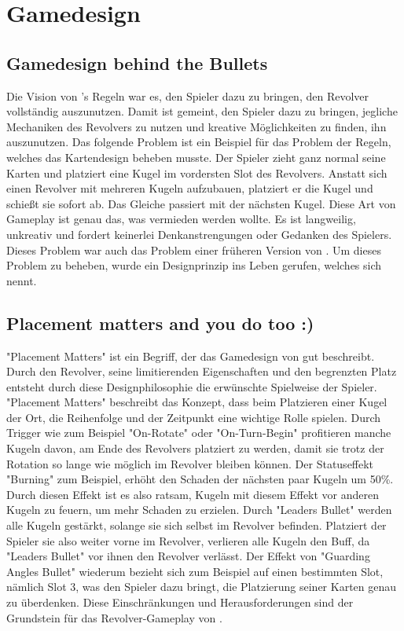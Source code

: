 
\section{Gamedesign}\label{sec:differenzierung}

\renewcommand{\kapitelautor}{Autor: Philip Jankovic} %


\subsection{Gamedesign behind the Bullets}\label{subsec:gamedesignBehindBullets}

Die Vision von \FF's Regeln war es, den Spieler dazu zu bringen, den Revolver vollständig auszunutzen. Damit ist gemeint,
den Spieler dazu zu bringen, jegliche Mechaniken des Revolvers zu nutzen und kreative Möglichkeiten zu finden, ihn auszunutzen.
Das folgende Problem ist ein Beispiel für das Problem der \FF Regeln, welches das Kartendesign beheben musste.
Der Spieler zieht ganz normal seine Karten und platziert eine Kugel im vordersten Slot des Revolvers.
Anstatt sich einen Revolver mit mehreren Kugeln aufzubauen, platziert er die Kugel und schießt sie sofort ab.
Das Gleiche passiert mit der nächsten Kugel. Diese Art von Gameplay ist genau das, was vermieden werden wollte.
Es ist langweilig, unkreativ und fordert keinerlei Denkanstrengungen oder Gedanken des Spielers.
Dieses Problem war auch das Problem einer früheren Version von \FF. Um dieses Problem zu beheben, wurde ein Designprinzip
ins Leben gerufen, welches sich  nennt.


\subsection{Placement matters and you do too :)}\label{subsec:placementMatters}

"Placement Matters" ist ein Begriff, der das Gamedesign von \FF gut beschreibt. Durch den Revolver, seine limitierenden
Eigenschaften und den begrenzten Platz entsteht durch diese Designphilosophie die erwünschte Spielweise der Spieler.
"Placement Matters" beschreibt das Konzept, dass beim Platzieren einer Kugel der Ort, die Reihenfolge und der Zeitpunkt
eine wichtige Rolle spielen. Durch Trigger wie zum Beispiel "On-Rotate" oder "On-Turn-Begin" profitieren manche Kugeln davon,
am Ende des Revolvers platziert zu werden, damit sie trotz der Rotation so lange wie möglich im Revolver bleiben können.
Der Statuseffekt "Burning" zum Beispiel, erhöht den Schaden der nächsten paar Kugeln um 50\%.
Durch diesen Effekt ist es also ratsam, Kugeln mit diesem Effekt vor anderen Kugeln zu feuern, um mehr Schaden zu erzielen.
Durch "Leaders Bullet" werden alle Kugeln gestärkt, solange sie sich selbst im Revolver befinden. Platziert der Spieler sie also
weiter vorne im Revolver, verlieren alle Kugeln den Buff, da "Leaders Bullet" vor ihnen den Revolver verlässt.
Der Effekt von "Guarding Angles Bullet" wiederum bezieht sich zum Beispiel auf einen bestimmten Slot, nämlich Slot 3,
was den Spieler dazu bringt, die Platzierung seiner Karten genau zu überdenken. Diese Einschränkungen und Herausforderungen
sind der Grundstein für das Revolver-Gameplay von \FF.


